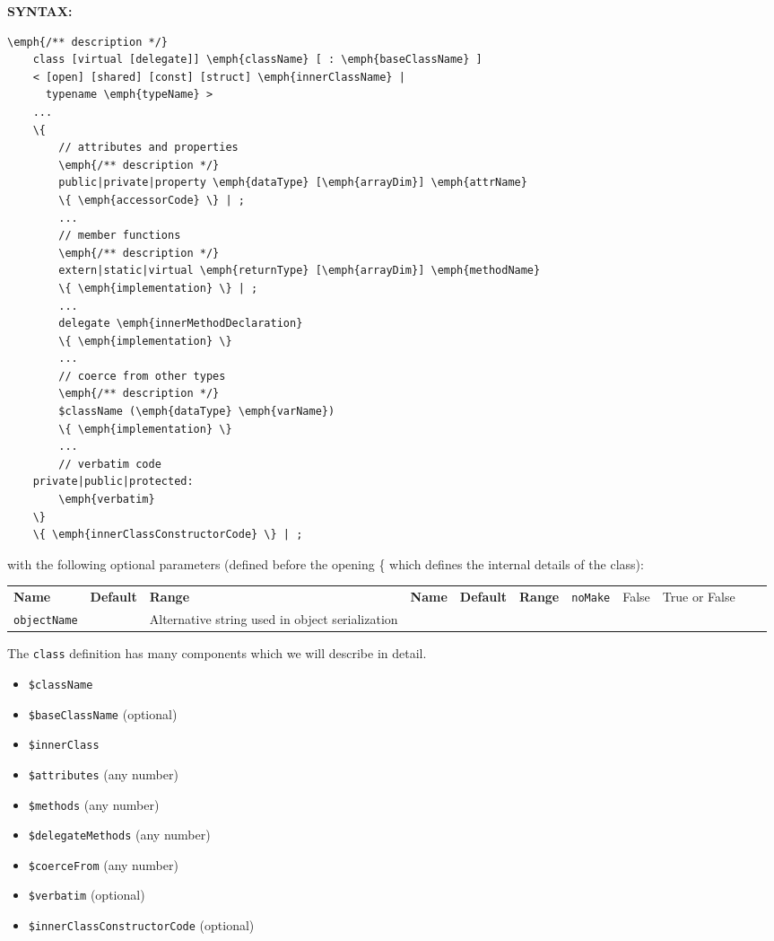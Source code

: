 \textbf{SYNTAX:}
\nopagebreak
\begin{Verbatim}[commandchars=\\\{\}]
    \emph{/** description */}
    class [virtual [delegate]] \emph{className} [ : \emph{baseClassName} ]
    < [open] [shared] [const] [struct] \emph{innerClassName} |
      typename \emph{typeName} >
    ...
    \{
        // attributes and properties
        \emph{/** description */}
        public|private|property \emph{dataType} [\emph{arrayDim}] \emph{attrName}
        \{ \emph{accessorCode} \} | ;
        ...
        // member functions
        \emph{/** description */}
        extern|static|virtual \emph{returnType} [\emph{arrayDim}] \emph{methodName}
        \{ \emph{implementation} \} | ;
        ...
        delegate \emph{innerMethodDeclaration} 
        \{ \emph{implementation} \}
        ...
        // coerce from other types
        \emph{/** description */}
        $className (\emph{dataType} \emph{varName})
        \{ \emph{implementation} \}
        ...
        // verbatim code
    private|public|protected:
        \emph{verbatim}
    \}
    \{ \emph{innerClassConstructorCode} \} | ;
\end{Verbatim}

with the following optional parameters (defined before the opening \{ which defines the internal details of the class):

\small

\begin{longtable}{|p{80pt}|p{150pt}|p{140pt}|l}

 \textbf{Name} & \textbf{Default} & \textbf{Range} & 
\endfirsthead

 \textbf{Name} & \textbf{Default} & \textbf{Range} & 
\endhead

 
\endfoot

\endlastfoot

 \texttt{noMake} & False & True or False \\ 

 \texttt{objectName} &  & Alternative string used in object serialization \\ 

\end{longtable}
\normalsize

The \texttt{class} definition has many components which we will describe in detail.
\begin{itemize}
\item \texttt{\$className}
\item \texttt{\$baseClassName} (optional)
\item \texttt{\$innerClass}
\item \texttt{\$attributes} (any number)
\item \texttt{\$methods} (any number)
\item \texttt{\$delegateMethods} (any number)
\item \texttt{\$coerceFrom} (any number)
\item \texttt{\$verbatim} (optional)
\item \texttt{\$innerClassConstructorCode} (optional)
\end{itemize}

